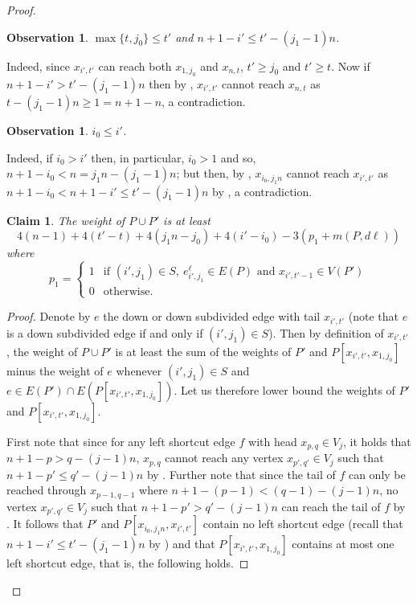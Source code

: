 \documentclass[a4paper,11pt]{article}
\theoremstyle{plain}
\newtheorem{observation}[theorem]{Observation}
\newtheorem{claim}[theorem]{Claim}
\newtheorem{identification rule}{Identification Rule}
\theoremstyle{definition}
\theoremstyle{remark}
\newenvironment{claimproof}{\begin{proof}\renewcommand{\qedsymbol}{\claimqed}}{\end{proof}\renewcommand{\qedsymbol}{\plainqed}}
\let\plainqed\qedsymbol
\newcommand{\claimqed}{$\lrcorner$}
\begin{document}
\begin{proof}
\begin{observation}
\label{obs:i't'}
$\max\{t,j_0\} \leq t'$ and $n+1-i' \leq t' - (j_1-1)n$.
\end{observation}

Indeed, since $x_{i',t'}$ can reach both $x_{1,j_0}$ and $x_{n,t}$, $t' \geq j_0$ and $t' \geq t$. Now if $n+1-i' > t' - (j_1-1)n$ then by , $x_{i',t'}$ cannot reach $x_{n,t}$ as $t - (j_1-1)n \geq 1 = n+1 -n$, a contradiction. 

\begin{observation}
\label{obs:i0i'}
$i_0 \leq i'$.
\end{observation}

Indeed, if $i_0 > i'$ then, in particular, $i_0 > 1$ and so, $n+1-i_0 < n = j_1n - (j_1-1)n$; but then, by , $x_{i_0,j_1n}$ cannot reach $x_{i',t'}$ as $n+1-i_0 < n+1 - i' \leq t' - (j_1-1)n$ by , a contradiction. 

\begin{claim}
\label{clm:weightPP'}
The weight of $P \cup P'$ is at least
\[
4(n-1) + 4(t'-t) + 4(j_1n-j_0) + 4(i'-i_0) - 3(p_1 + m(P,d\ell))
\]
where 
$$
p_1 = \left\{
    \begin{array}{ll}
        1 & \mbox{if } (i',j_1) \in S, ~e^\ell_{i',j_1} \in E(P) \mbox{ and } x_{i',t'-1} \in V(P') \\
        0 & \mbox{otherwise.}
    \end{array}
\right.
$$
\end{claim}

\begin{claimproof}
Denote by $e$ the down or down subdivided edge with tail $x_{i',t'}$ (note that $e$ is a down subdivided edge if and only if $(i',j_1) \in S$). Then by definition of $x_{i',t'}$, the weight of $P \cup P'$ is at least the sum of the weights of $P'$ and $P[x_{i',t'},x_{1,j_0}]$ minus the weight of $e$ whenever $(i',j_1) \in S$ and $e \in E(P') \cap E(P[x_{i',t'},x_{1,j_0}])$. Let us therefore lower bound the weights of $P'$ and $P[x_{i',t'},x_{1,j_0}]$.

First note that since for any left shortcut edge $f$ with head $x_{p,q} \in V_j$, it holds that $n+1-p > q-(j-1)n$, $x_{p,q}$ cannot reach any vertex $x_{p',q'} \in V_j$ such that $n+1-p' \leq q' - (j-1)n$ by . Further note that since the tail of $f$ can only be reached through $x_{p-1,q-1}$ where $n+1 - (p-1) < (q-1) - (j-1)n$, no vertex $x_{p',q'} \in V_j$ such that $n+1 - p' > q' - (j-1)n$ can reach the tail of $f$ by . It follows that $P'$ and $P[x_{i_0,j_1n},x_{i',t'}]$ contain no left shortcut edge (recall that $n+1-i' \leq t' - (j_1-1)n$ by ) and that $P[x_{i',t'},x_{1,j_0}]$ contains at most one left shortcut edge, that is, the following holds.


\end{claimproof}
\end{proof}
\end{document}
